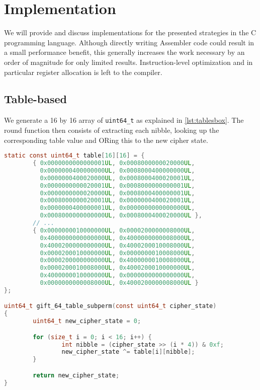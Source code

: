 \chapter{Implementation}

We will provide and discuss implementations for the presented strategies in the
C programming language. Although directly writing Assembler code could result
in a small performance benefit, this generally increases the work necessary by
an order of magnitude for only limited results. Instruction-level optimization
and in particular register allocation is left to the compiler.

\section{Table-based}

We generate a 16 by 16 array of \texttt{uint64\_t} as explained in \ref{lst:tablesbox}.
The round function then consists of extracting each nibble, looking up the
corresponding table value and ORing this to the new cipher state.

\begin{lstlisting}[caption={Table-based round function}, language=c]
static const uint64_t table[16][16] = {
        { 0x0000000000000001UL, 0x0008000000020000UL,
          0x0000000400000000UL, 0x0008000400000000UL,
          0x0000000400020000UL, 0x0008000400020001UL,
          0x0000000000020001UL, 0x0008000000000001UL,
          0x0000000000020000UL, 0x0008000400000001UL,
          0x0008000000020001UL, 0x0000000400020001UL,
          0x0000000400000001UL, 0x0000000000000000UL,
          0x0008000000000000UL, 0x0008000400020000UL },
        // ...
        { 0x0000000010000000UL, 0x0000200000008000UL,
          0x4000000000000000UL, 0x4000000000008000UL,
          0x4000200000000000UL, 0x4000200010008000UL,
          0x0000200010000000UL, 0x0000000010008000UL,
          0x0000200000000000UL, 0x4000000010008000UL,
          0x0000200010008000UL, 0x4000200010000000UL,
          0x4000000010000000UL, 0x0000000000000000UL,
          0x0000000000008000UL, 0x4000200000008000UL }
};

uint64_t gift_64_table_subperm(const uint64_t cipher_state)
{
        uint64_t new_cipher_state = 0;

        for (size_t i = 0; i < 16; i++) {
                int nibble = (cipher_state >> (i * 4)) & 0xf;
                new_cipher_state ^= table[i][nibble];
        }

        return new_cipher_state;
}
\end{lstlisting}

